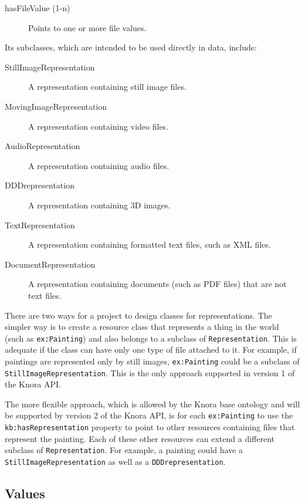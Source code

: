 \documentclass[12pt, a4paper]{article}
\begin{document}
\begin{description}
	\item[hasFileValue (1-n)] Points to one or more file values.
\end{description}

Its subclasses, which are intended to be used directly in data, include:

\begin{description}
	\item[StillImageRepresentation] A representation containing still image files.
	\item[MovingImageRepresentation] A representation containing video files.
	\item[AudioRepresentation] A representation containing audio files.
	\item[DDDrepresentation] A representation containing 3D images.
	\item[TextRepresentation] A representation containing formatted text files, such as XML files.
	\item[DocumentRepresentation] A representation containing documents (such as PDF files) that are not text files.
\end{description}

There are two ways for a project to design classes for representations. The simpler way is to create a resource class that represents a thing in the world (such as \texttt{ex:Painting}) and also belongs to a subclass of \texttt{Representation}. This is adequate if the class can have only one type of file attached to it. For example, if paintings are represented only by still images, \texttt{ex:Painting} could be a subclass of \texttt{Still\-Image\-Representation}. This is the only approach supported in version 1 of the Knora API.

The more flexible approach, which is allowed by the Knora base ontology and will be supported by version 2 of the Knora API, is for each \texttt{ex:Painting} to use the \texttt{kb:hasRepresentation} property to point to other resources containing files that represent the painting. Each of these other resources can extend a different subclass of \texttt{Representation}. For example, a painting could have a \texttt{Still\-Image\-Representation} as well as a \texttt{DDDrepresentation}.

\subsection{Values}
\end{document}
